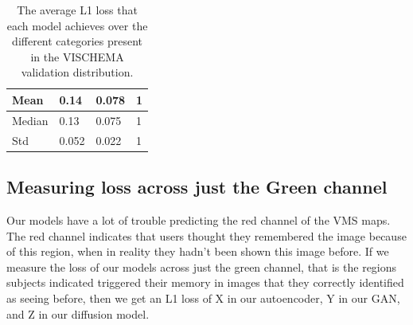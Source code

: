 \documentclass{UoYCSproject}
\begin{document}
\begin{table}[]
\begin{tabular}{|l|lll|}
        \hline
        Mean                   & \multicolumn{1}{l|}{0.14}        & \multicolumn{1}{l|}{0.078}& 1                                    \\ \hline
        Median                 & \multicolumn{1}{l|}{0.13}        & \multicolumn{1}{l|}{0.075}& 1                                    \\ \hline
        Std                    & \multicolumn{1}{l|}{0.052}       & \multicolumn{1}{l|}{0.022}& 1                                    \\ \hline
    \end{tabular}
    \label{tab:categories}
    \caption{The average L1 loss that each model achieves over the different categories present in the VISCHEMA validation distribution.}
\end{table}

\subsection{Measuring loss across just the Green channel}

Our models have a lot of trouble predicting the red channel of the VMS maps. The red channel indicates that users thought they remembered the image because of this region, when in reality they hadn't been shown this image before. If we measure the loss of our models across just the green channel, that is the regions subjects indicated triggered their memory in images that they correctly identified as seeing before, then we get an L1 loss of X in our autoencoder, Y in our GAN, and Z in our diffusion model.


\end{document}
